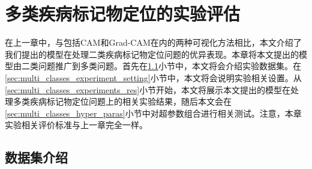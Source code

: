 \chapter{多类疾病标记物定位的实验评估}\label{sec:multi_classes}
在上一章中，与包括CAM和Grad-CAM在内的两种可视化方法相比，本文介绍了我们提出的模型在处理二类疾病标记物定位问题的优异表现。本章将本文提出的模型由二类问题推广到多类问题。首先在\ref{sec:mul_classes_ds_intro}小节中，本文将会介绍实验数据集。在\ref{sec:multi_classes_experiment_setting}小节中，本文将会说明实验相关设置。从\ref{sec:multi_classes_experiments_res}小节开始，本文将展示本文提出的模型在处理多类疾病标记物定位问题上的相关实验结果，随后本文会在\ref{sec:multi_classes_hyper_paras}小节中对超参数组合进行相关测试。注意，本章实验相关评价标准与上一章完全一样。
\section{数据集介绍}\label{sec:mul_classes_ds_intro}
